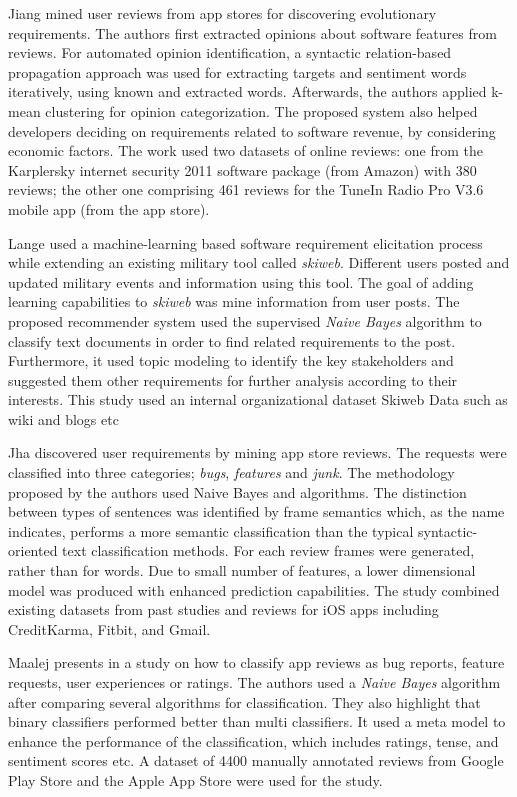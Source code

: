 Jiang \etal \cite{Jiang:2014} mined user reviews from app stores for discovering
evolutionary requirements. The authors first extracted opinions about software
features from reviews. For automated opinion identification, a syntactic
relation-based propagation approach was used for extracting targets and
sentiment words iteratively, using known and extracted words. Afterwards, the
authors applied k-mean clustering for opinion categorization. The proposed
system also helped developers deciding on requirements related to software
revenue, by considering economic factors. The work used two datasets of online
reviews: one from the Karplersky internet security 2011 software package (from Amazon) with 380
reviews; the other one comprising 461 reviews for the TuneIn Radio Pro V3.6
mobile app (from the app store).

Lange \etal\cite{Douglas:S2008} used a machine-learning based software
requirement elicitation process while extending an existing military tool called
\emph{skiweb}.  Different users posted and updated military events and
information using this tool. The goal of adding learning capabilities to
\emph{skiweb} was mine information from user posts. The proposed recommender
system used the supervised \emph{Naive Bayes} algorithm to classify text
documents in order to find related requirements to the post. Furthermore, it used topic
modeling to identify the key stakeholders and suggested them other requirements
for further analysis according to their interests. This study used an internal
organizational dataset Skiweb Data such as wiki and blogs etc

Jha \etal \cite{Jha:2017} discovered user requirements by mining app store
reviews. The requests were classified into three categories; \emph{bugs},
\emph{features} and \emph{junk}. The methodology proposed by the authors used
Naive Bayes and \SVM algorithms. The distinction between types of sentences was
identified by frame semantics  which, as the name indicates, performs
a more semantic classification than the typical syntactic-oriented text
classification methods. For each review frames were generated, rather than for
words. Due to small number of features, a lower dimensional model was
produced with enhanced prediction capabilities. The study combined existing
datasets from past studies and reviews for iOS apps including CreditKarma,
Fitbit, and Gmail.

Maalej \etal presents in \cite{Maalej} a study on how to classify app reviews as
bug reports, feature requests, user experiences or ratings. The authors used a
\emph{Naive Bayes} algorithm after comparing several algorithms for
classification. They also highlight that binary classifiers performed better
than multi classifiers. It used a meta model to enhance the performance of the
classification, which includes ratings, tense, and sentiment scores etc. A
dataset of 4400 manually annotated reviews from Google Play Store and the Apple
App Store were used for the study.

